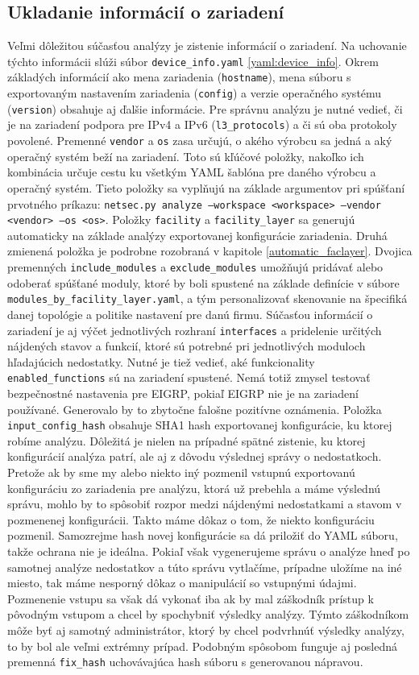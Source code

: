 \subsection{Ukladanie informácií o zariadení}
\label{device_info}
Veľmi dôležitou súčasťou analýzy je zistenie informácií o zariadení. Na uchovanie týchto informácii slúži súbor \texttt{device\_info.yaml} \ref{yaml:device_info}. Okrem základých informácií ako mena zariadenia (\texttt{hostname}), mena súboru s exportovaným nastavením zariadenia (\texttt{config}) a verzie operačného systému (\texttt{version}) obsahuje aj ďalšie informácie. Pre správnu analýzu je nutné vedieť, či je na zariadení podpora pre IPv4 a IPv6 (\texttt{l3\_protocols}) a či sú oba protokoly povolené. Premenné \texttt{vendor} a \texttt{os} zasa určujú, o akého výrobcu sa jedná a aký operačný systém beží na zariadení. Toto sú kľúčové položky, nakoľko ich kombinácia určuje cestu ku všetkým YAML šablóna pre daného výrobcu a operačný systém. Tieto položky sa vyplňujú na základe argumentov pri spúšťaní prvotného príkazu: \texttt{netsec.py analyze ---workspace <workspace> ---vendor <vendor> ---os <os>}. Položky \texttt{facility} a \texttt{facility\_layer} sa generujú automaticky na základe analýzy exportovanej konfigurácie zariadenia. Druhá zmienená položka je podrobne rozobraná v kapitole \ref{automatic_faclayer}. Dvojica premenných \texttt{include\_modules} a \texttt{exclude\_modules} umožňujú pridávať alebo odoberať spúšťané moduly, ktoré by boli spustené na základe definície v súbore \texttt{modules\_by\_facility\_layer.yaml}, a tým personalizovať skenovanie na špecifiká danej topológie a politike nastavení pre danú firmu. Súčasťou informácií o zariadení je aj výčet jednotlivých rozhraní \texttt{interfaces} a pridelenie určitých nájdených stavov a funkcií, ktoré sú potrebné pri jednotlivých moduloch hľadajúcich nedostatky. Nutné je tiež vedieť, aké funkcionality \texttt{enabled\_functions} sú na zariadení spustené. Nemá totiž zmysel testovať bezpečnostné nastavenia pre EIGRP, pokiaľ EIGRP nie je na zariadení používané. Generovalo by to zbytočne falošne pozitívne oznámenia. Položka \texttt{input\_config\_hash} obsahuje SHA1 hash exportovanej konfigurácie, ku ktorej robíme analýzu. Dôležitá je nielen na prípadné spätné zistenie, ku ktorej konfigurácií analýza patrí, ale aj z dôvodu výslednej správy o nedostatkoch. Pretože ak by sme my alebo niekto iný pozmenil vstupnú exportovanú konfiguráciu zo zariadenia pre analýzu, ktorá už prebehla a máme výslednú správu, mohlo by to spôsobiť rozpor medzi nájdenými nedostatkami a stavom v pozmenenej konfigurácii. Takto máme dôkaz o tom, že niekto konfiguráciu pozmenil. Samozrejme hash novej konfigurácie sa dá priložiť do YAML súboru, takže ochrana nie je ideálna. Pokiaľ však vygenerujeme správu o analýze hneď po samotnej analýze nedostatkov a túto správu vytlačíme, prípadne uložíme na iné miesto, tak máme nesporný dôkaz o manipulácií so vstupnými údajmi. Pozmenenie vstupu sa však dá vykonať iba ak by mal záškodník prístup k pôvodným vstupom a chcel by spochybniť výsledky analýzy. Týmto záškodníkom môže byť aj samotný administrátor, ktorý by chcel podvrhnúť výsledky analýzy, to by bol ale veľmi extrémny prípad. Podobným spôsobom funguje aj posledná premenná \texttt{fix\_hash} uchovávajúca hash súboru s generovanou nápravou.  

